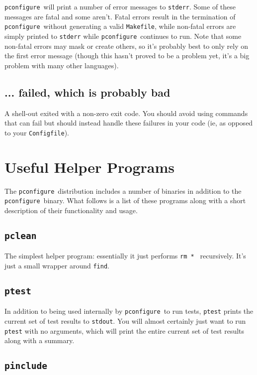 \documentclass{article}
\newcommand{\pconfigure}{\texttt{pconfigure}}
\begin{document}
\pconfigure\ will print a number of error messages to \texttt{stderr}.
Some of these messages are fatal and some aren't.  Fatal errors result
in the termination of \pconfigure\ without generating a valid
\texttt{Makefile}, while non-fatal errors are simply printed to
\texttt{stderr} while \pconfigure\ continues to run.  Note that some
non-fatal errors may mask or create others, so it's probably best to
only rely on the first error message (though this hasn't proved to be
a problem yet, it's a big problem with many other languages). %

\subsection{... failed, which is probably bad}

A shell-out exited with a non-zero exit code.  You should avoid using
commands that can fail but should instead handle these failures in
your code (ie, as opposed to your \texttt{Configfile}).

\section{Useful Helper Programs \label{prog}}

The \pconfigure\ distribution includes a number of binaries in
addition to the \pconfigure\ binary.  What follows is a list of these
programs along with a short description of their functionality and
usage.

\subsection{\texttt{pclean}}

The simplest helper program: essentially it just performs \texttt{rm
  *~} recursively.  It's just a small wrapper around \texttt{find}.

\subsection{\texttt{ptest} \label{prog:ptest}}

In addition to being used internally by \pconfigure\ to run tests,
\texttt{ptest} prints the current set of test results to
\texttt{stdout}.  You will almost certainly just want to run
\texttt{ptest} with no arguments, which will print the entire current
set of test results along with a summary.

\subsection{\texttt{pinclude}}
\end{document}
